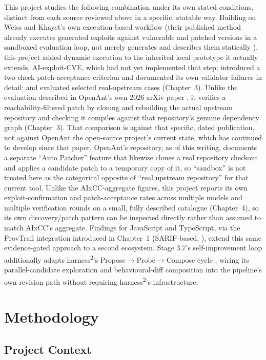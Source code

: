 \documentclass[12pt,a4paper]{report}
\begin{document}
This project studies the following combination under its own stated conditions, distinct from each source reviewed above in a specific, statable way. Building on Weiss and Khayet's own execution-based workflow (their published method already executes generated exploits against vulnerable and patched versions in a sandboxed evaluation loop, not merely generates and describes them statically \cite{weiss-khayet}), this project added dynamic execution to the inherited local prototype it actually extends, AI-exploit-CVE, which had not yet implemented that step; introduced a two-check patch-acceptance criterion and documented its own validator failures in detail; and evaluated selected real-upstream cases (Chapter~3). Unlike the evaluation described in OpenAnt's own 2026 arXiv paper \cite{openant}, it verifies a reachability-filtered patch by cloning and rebuilding the actual upstream repository and checking it compiles against that repository's genuine dependency graph (Chapter~3). That comparison is against that specific, dated publication, not against OpenAnt the open-source project's current state, which has continued to develop since that paper. OpenAnt's repository, as of this writing, documents a separate ``Auto Patcher'' feature that likewise clones a real repository checkout and applies a candidate patch to a temporary copy of it, so ``sandbox'' is not treated here as the categorical opposite of ``real upstream repository'' for that current tool. Unlike the AIxCC-aggregate figures, this project reports its own exploit-confirmation and patch-acceptance rates across multiple models and multiple verification rounds on a small, fully described catalogue (Chapter~4), so its own discovery/patch pattern can be inspected directly rather than assumed to match AIxCC's aggregate. Findings for JavaScript and TypeScript, via the ProvTrail integration introduced in Chapter~1 (SARIF-based, \cite{sarif}), extend this same evidence-gated approach to a second ecosystem. Stage 3.7's self-improvement loop additionally adapts harness\textsuperscript{2}'s Propose$\to$Probe$\to$Compose cycle \cite{harness2}, wiring its parallel-candidate exploration and behavioural-diff composition into the pipeline's own revision path without requiring harness\textsuperscript{2}'s infrastructure.

\chapter{Methodology}

\section{Project Context}
\end{document}
